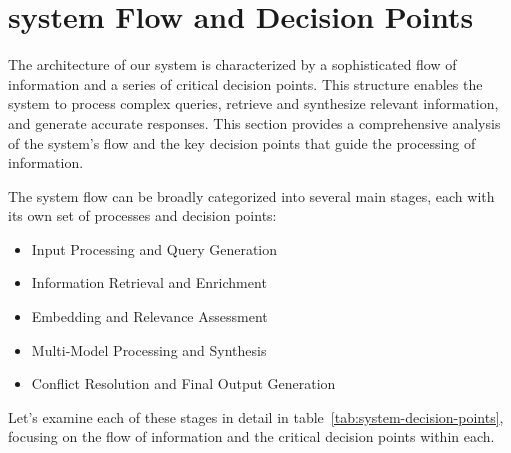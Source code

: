 \section{system Flow and Decision Points}\label{sec:system-flow-and-decision-points}
The architecture of our system is characterized by a sophisticated flow of information and a series of critical decision points.
This structure enables the system to process complex queries, retrieve and synthesize relevant information, and generate accurate responses.
This section provides a comprehensive analysis of the system's flow and the key decision points that guide the processing of information.

The system flow can be broadly categorized into several main stages, each with its own set of processes and decision points:
\begin{itemize}
    \item Input Processing and Query Generation
    \item Information Retrieval and Enrichment
    \item Embedding and Relevance Assessment
    \item Multi-Model Processing and Synthesis
    \item Conflict Resolution and Final Output Generation
\end{itemize}
Let's examine each of these stages in detail in table~\ref{tab:system-decision-points}, focusing on the flow of information and the critical decision points within each.
